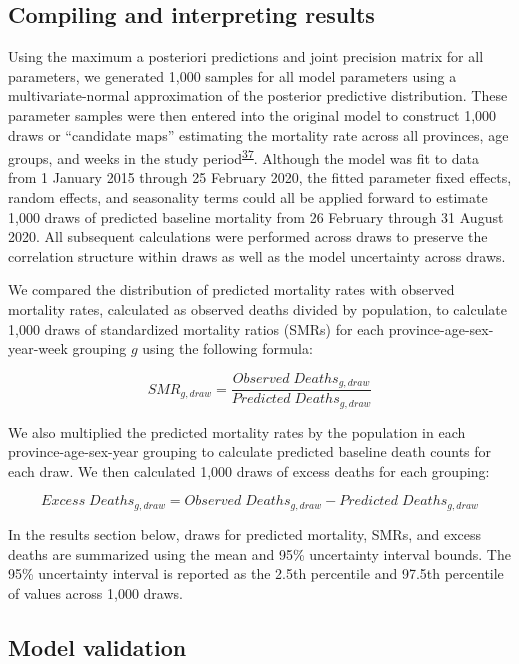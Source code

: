 \documentclass[
]{article}
\begin{document}
\hypertarget{compiling-and-interpreting-results}{%
\subsection{Compiling and interpreting results}\label{compiling-and-interpreting-results}}

Using the maximum a posteriori predictions and joint precision matrix for all parameters, we generated 1,000 samples for all model parameters using a multivariate-normal approximation of the posterior predictive distribution. These parameter samples were then entered into the original model to construct 1,000 draws or ``candidate maps'' estimating the mortality rate across all provinces, age groups, and weeks in the study period\textsuperscript{\protect\hyperlink{ref-Patil2011}{37}}⁠. Although the model was fit to data from 1 January 2015 through 25 February 2020, the fitted parameter fixed effects, random effects, and seasonality terms could all be applied forward to estimate 1,000 draws of predicted baseline mortality from 26 February through 31 August 2020. All subsequent calculations were performed across draws to preserve the correlation structure within draws as well as the model uncertainty across draws.

We compared the distribution of predicted mortality rates with observed mortality rates, calculated as observed deaths divided by population, to calculate 1,000 draws of standardized mortality ratios (SMRs) for each province-age-sex-year-week grouping \(g\) using the following formula:

\[SMR_{g,draw} = \frac{Observed\;Deaths_{g,draw}}{Predicted\;Deaths_{g,draw}}\]

We also multiplied the predicted mortality rates by the population in each province-age-sex-year grouping to calculate predicted baseline death counts for each draw. We then calculated 1,000 draws of excess deaths for each grouping:

\[Excess\;Deaths_{g,draw}=Observed\;Deaths_{g,draw}-Predicted\;Deaths_{g,draw}\]

In the results section below, draws for predicted mortality, SMRs, and excess deaths are summarized using the mean and 95\% uncertainty interval bounds. The 95\% uncertainty interval is reported as the 2.5th percentile and 97.5th percentile of values across 1,000 draws.

\hypertarget{model-validation}{%
\subsection{Model validation}\label{model-validation}}
\end{document}
